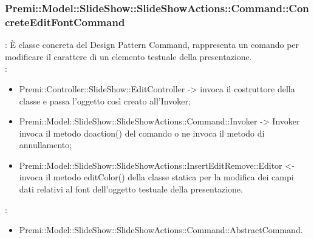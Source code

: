 {                    \subsubsection{Premi::Model::SlideShow::SlideShowActions::Command::ConcreteEditFontCommand}{
				\textbf{\tipo}: È classe concreta del Design Pattern Command, rappresenta un comando per modificare il carattere di un elemento testuale della presentazione.\\	
				\textbf{\relaz}: 
				\begin{itemize}
					\item Premi::Controller::SlideShow::EditController -> invoca il costruttore della classe e passa l’oggetto così creato all’Invoker;
					\item Premi::Model::SlideShow::SlideShowActions::Command::Invoker -> Invoker invoca il metodo doaction() del comando o ne invoca il metodo di annullamento;
                    \item Premi::Model::SlideShow::SlideShowActions::InsertEditRemove::Editor <- invoca il metodo editColor() della classe statica per la modifica dei campi dati relativi al font dell'oggetto testuale della presentazione.
				\end{itemize}	
                \textbf{\base}: 
                    \begin{itemize}
                    \item Premi::Model::SlideShow::SlideShowActions::Command::AbstractCommand.
                    \end{itemize}
                    }
                    }
